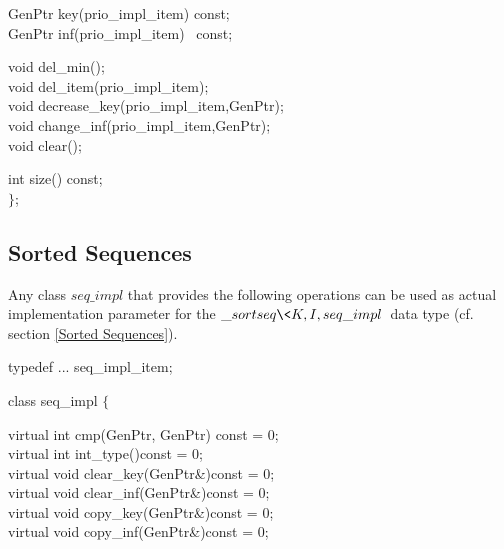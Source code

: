 {\hspace*{.5cm}GenPtr key(prio\_impl\_item) const;\\
\hspace*{.5cm}GenPtr inf(prio\_impl\_item) \ const;

\hspace*{.5cm}void del\_min();\\
\hspace*{.5cm}void del\_item(prio\_impl\_item);\\
\hspace*{.5cm}void decrease\_key(prio\_impl\_item,GenPtr);\\
\hspace*{.5cm}void change\_inf(prio\_impl\_item,GenPtr);\\
\hspace*{.5cm}void clear();
  
\hspace*{.5cm}int  size()  const;\\
$\}$;

\newpage

\subsection{Sorted Sequences}

\label{User Implementations Sorted Sequences}

Any class $seq\_impl$ that provides the following operations can be used as 
actual implementation parameter for the $\_sortseq\<K,I,seq\_impl\>$ data
type (cf. section \ref{Sorted Sequences}).

typedef ... seq\_impl\_item;

class seq\_impl  $\{$

\hspace*{.5cm}virtual int  cmp(GenPtr, GenPtr) const = 0;\\
\hspace*{.5cm}virtual int  int\_type()\hspace*{2.25cm}const = 0;\\
\hspace*{.5cm}virtual void clear\_key(GenPtr\&)\hspace*{.3cm}const = 0;\\
\hspace*{.5cm}virtual void clear\_inf(GenPtr\&)\hspace*{.4cm}const = 0;\\
\hspace*{.5cm}virtual void copy\_key(GenPtr\&)\hspace*{.3cm}const = 0;\\
\hspace*{.5cm}virtual void copy\_inf(GenPtr\&)\hspace*{.45cm}const = 0;

}
